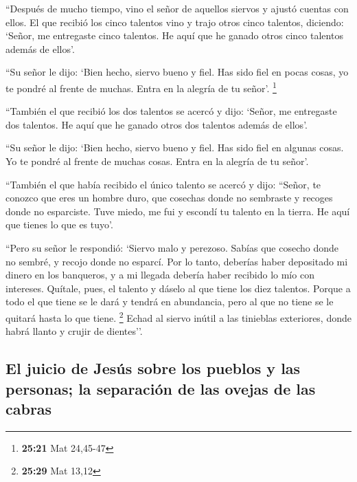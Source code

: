 \begin{paracol}{2}
 ``Después de mucho tiempo, vino el señor de aquellos
siervos y ajustó cuentas con ellos.  El que recibió los
cinco talentos vino y trajo otros cinco talentos, diciendo: `Señor, me
entregaste cinco talentos. He aquí que he ganado otros cinco talentos
además de ellos'.

 ``Su señor le dijo: `Bien hecho, siervo bueno y fiel.
Has sido fiel en pocas cosas, yo te pondré al frente de muchas. Entra en
la alegría de tu señor'. \footnote{\textbf{25:21} Mat 24,45-47}

 ``También el que recibió los dos talentos se acercó y
dijo: `Señor, me entregaste dos talentos. He aquí que he ganado otros
dos talentos además de ellos'.

 ``Su señor le dijo: `Bien hecho, siervo bueno y fiel.
Has sido fiel en algunas cosas. Yo te pondré al frente de muchas cosas.
Entra en la alegría de tu señor'.

 ``También el que había recibido el único talento se
acercó y dijo: ``Señor, te conozco que eres un hombre duro, que cosechas
donde no sembraste y recoges donde no esparciste.  Tuve
miedo, me fui y escondí tu talento en la tierra. He aquí que tienes lo
que es tuyo'.

 ``Pero su señor le respondió: `Siervo malo y perezoso.
Sabías que cosecho donde no sembré, y recojo donde no esparcí.
 Por lo tanto, deberías haber depositado mi dinero en los
banqueros, y a mi llegada debería haber recibido lo mío con intereses.
 Quítale, pues, el talento y dáselo al que tiene los diez
talentos.  Porque a todo el que tiene se le dará y tendrá
en abundancia, pero al que no tiene se le quitará hasta lo que tiene.
\footnote{\textbf{25:29} Mat 13,12}  Echad al siervo
inútil a las tinieblas exteriores, donde habrá llanto y crujir de
dientes''.

\hypertarget{el-juicio-de-jesuxfas-sobre-los-pueblos-y-las-personas-la-separaciuxf3n-de-las-ovejas-de-las-cabras}{%
\subsection{El juicio de Jesús sobre los pueblos y las personas; la
separación de las ovejas de las
cabras}\label{el-juicio-de-jesuxfas-sobre-los-pueblos-y-las-personas-la-separaciuxf3n-de-las-ovejas-de-las-cabras}}


\end{paracol}
